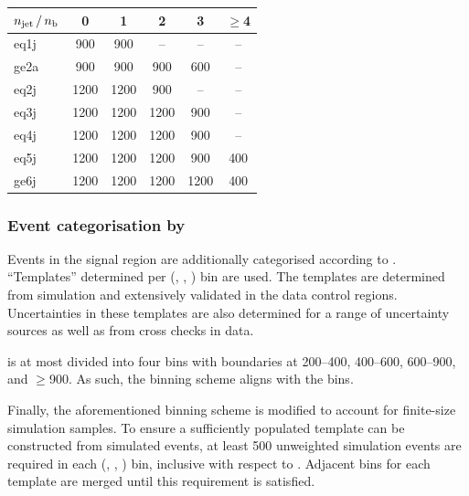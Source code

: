 \begin{table}[!h]
  \label{tab:sr-binning}
  \centering
  \begin{tabular}{ lccccc }
    \hline
    $n_{\text{jet}}\, / \,n_{\text{b}}$ & 0    & 1    & 2    & 3    & $\geq$4 \\
    \hline
    eq1j              & 900  & 900  & --   & --   & --      \\ 
    ge2a              & 900  & 900  & 900  & 600  & --      \\ 
    eq2j              & 1200 & 1200 & 900  & --   & --      \\ 
    eq3j              & 1200 & 1200 & 1200 & 900  & --      \\ 
    eq4j              & 1200 & 1200 & 1200 & 900  & --      \\ 
    eq5j              & 1200 & 1200 & 1200 & 900  & 400     \\ 
    ge6j              & 1200 & 1200 & 1200 & 1200 & 400     \\ 
    \hline
  \end{tabular}
\end{table}

\subsubsection{Event categorisation by \texorpdfstring{\HTmiss}{HTmiss}}
\label{sec:htmiss-categorisation}

Events in the signal region are additionally categorised according to
\HTmiss. ``Templates'' determined per (\njet, \scalht, \nb) bin are
used. The templates are determined from simulation and extensively
validated in the data control regions. Uncertainties in these
templates are also determined for a range of uncertainty sources as
well as from cross checks in data.

\HTmiss is at most divided into four bins with boundaries at 200--400,
400--600, 600--900, and $\ge$900\GeV.  As such, the \HTmiss binning scheme
aligns with the \scalht bins.

Finally, the aforementioned \HTmiss binning scheme is modified to
account for finite-size simulation samples. To ensure a sufficiently
populated \HTmiss template can be constructed from simulated events,
at least 500 unweighted simulation events are required in each (\njet,
\scalht, \MHT) bin, inclusive with respect to \nb. Adjacent \HTmiss
bins for each template are merged until this requirement is satisfied.

